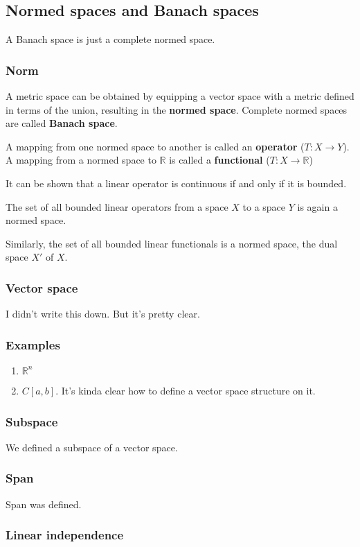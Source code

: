 \documentclass[11pt]{article}
\def\R{\mathbb{R}}
\begin{document}
\subsection{Normed spaces and Banach spaces}
\label{sec:orga2f3974}
A Banach space is just a complete normed space.
\subsubsection{Norm}
\label{sec:org2275219}
A metric space can be obtained by equipping a vector space with a metric
defined in terms of the union, resulting in the \textbf{normed space}. Complete
normed spaces are called \textbf{Banach space}.

A mapping from one normed space to another is called an \textbf{operator} (\(T\colon
    X \rightarrow Y\)). A mapping from a normed space to \(\R\) is called a
\textbf{functional} (\(T\colon X \rightarrow \R\))

It can be shown that a linear operator is continuous if and only if it is
bounded.

The set of all bounded linear operators from a space \(X\) to a space \(Y\) is
again a normed space.

Similarly, the set of all bounded linear functionals is a normed space, the
dual space \(X'\) of \(X\).
\subsubsection{Vector space}
\label{sec:orgbf59aaf}
I didn't write this down. But it's pretty clear. 
\subsubsection{Examples}
\label{sec:org7273f78}
\begin{enumerate}
\item \(\R^n\)
\item \(C[a, b]\). It's kinda clear how to define a vector space structure on it.
\end{enumerate}
\subsubsection{Subspace}
\label{sec:orge3be810}
We defined a subspace of a vector space. 
\subsubsection{Span}
\label{sec:orgb542fea}
Span was defined.
\subsubsection{Linear independence}
\label{sec:orgbd8c9e1}
\end{document}

